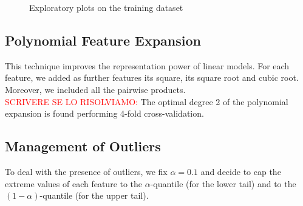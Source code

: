 \documentclass[10pt,conference,compsocconf]{IEEEtran}
\begin{document}
\begin{figure}[h]
    \centering
    \quad
    \caption{Exploratory plots on the training dataset}
    \label{fig:empdistr}
\end{figure}

\subsection{Polynomial Feature Expansion}
This technique improves the representation power of linear models. For each feature, we added as further features its square, its square root and cubic root.
Moreover, we included all the pairwise products.\\
\textcolor{red}{SCRIVERE SE LO RISOLVIAMO:} The optimal degree 2 of the polynomial expansion is found performing 4-fold cross-validation.

\subsection{Management of Outliers}
To deal with the presence of outliers, we fix $\alpha = 0.1$ and decide to cap the extreme values of each feature to the $\alpha$-quantile (for the lower tail) and to the $(1-\alpha)$-quantile (for the upper tail).
\end{document}
